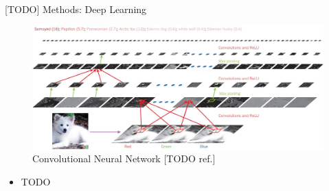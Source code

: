 \documentclass[final,hyperref={pdfpagelabels=false}]{beamer}
\begin{document}
\begin{frame}[t]
\begin{columns}[t]
\begin{column}{.465\textwidth}
\begin{block}{[TODO] Methods: Deep Learning}
\begin{figure}
\includegraphics[width=.9\linewidth]{nature-deep-learning/fig_2}
\caption{Convolutional Neural Network [TODO ref.]}
\end{figure}
\begin{itemize}
\item TODO
\end{itemize}


\end{block}
\end{column}
\end{columns}
\end{frame}
\end{document}
